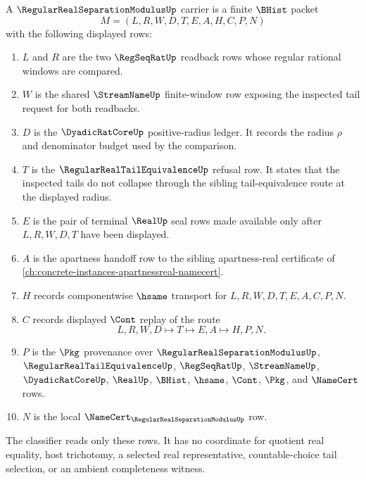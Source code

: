 \begin{definition}
\label{def:regular-real-separation-modulus-carrier}
A $\RegularRealSeparationModulusUp$ carrier is a finite $\BHist$ packet
$$
M=(L,R,W,D,T,E,A,H,C,P,N)
$$
with the following displayed rows:
\begin{enumerate}
\item $L$ and $R$ are the two $\RegSeqRatUp$ readback rows whose regular rational windows are compared.
\item $W$ is the shared $\StreamNameUp$ finite-window row exposing the inspected tail request for both readbacks.
\item $D$ is the $\DyadicRatCoreUp$ positive-radius ledger. It records the radius $\rho$ and denominator budget used by the comparison.
\item $T$ is the $\RegularRealTailEquivalenceUp$ refusal row. It states that the inspected tails do not collapse through the sibling tail-equivalence route at the displayed radius.
\item $E$ is the pair of terminal $\RealUp$ seal rows made available only after $L,R,W,D,T$ have been displayed.
\item $A$ is the apartness handoff row to the sibling apartness-real certificate of \autoref{ch:concrete-instances-apartnessreal-namecert}.
\item $H$ records componentwise $\hsame$ transport for $L,R,W,D,T,E,A,C,P,N$.
\item $C$ records displayed $\Cont$ replay of the route
$$
L,R,W,D \longmapsto T \longmapsto E,A \longmapsto H,P,N .
$$
\item $P$ is the $\Pkg$ provenance over $\RegularRealSeparationModulusUp$, $\RegularRealTailEquivalenceUp$, $\RegSeqRatUp$, $\StreamNameUp$, $\DyadicRatCoreUp$, $\RealUp$, $\BHist$, $\hsame$, $\Cont$, $\Pkg$, and $\NameCert$ rows.
\item $N$ is the local $\NameCert_{\RegularRealSeparationModulusUp}$ row.
\end{enumerate}
The classifier reads only these rows. It has no coordinate for quotient real equality, host trichotomy, a selected real representative, countable-choice tail selection, or an ambient completeness witness.
\end{definition}


